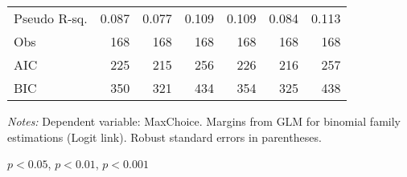 \begin{table}[htbp]
\begin{adjustbox}{width=1\textwidth}
\begin{threeparttable}
\begin{tabular}{l*{6}{D{.}{.}{-1}}}
\midrule
Pseudo R-sq.        &               0.087  &            0.077    &                  0.109     &              0.109    &             0.084   &                0.113 \\
Obs                 &                 168   &                 168   &                 168   &                 168   &                 168   &                 168   \\
AIC                 &                 225   &                 215   &                 256   &                 226   &                 216   &                 257   \\
BIC                 &                 350   &                 321   &                 434   &                 354   &                 325   &                 438   \\
\bottomrule
\end{tabular}
\begin{tablenotes}
\footnotesize
\item \textit{Notes:} Dependent variable: MaxChoice. Margins from GLM for binomial family estimations (Logit link). Robust standard errors in parentheses. \\
\item \sym{*} \(p<0.05\), \sym{**} \(p<0.01\), \sym{***} \(p<0.001\)
\end{tablenotes}
\end{threeparttable}
\end{adjustbox}
\label{tab:maxtot}
\end{table}